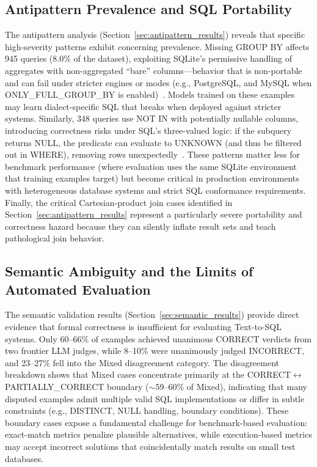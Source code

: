 \documentclass[]{einformatica}
\begin{document}
\subsection{Antipattern Prevalence and SQL Portability}

The antipattern analysis (Section~\ref{sec:antipattern_results}) reveals that specific high-severity patterns exhibit concerning prevalence. Missing GROUP BY affects 945 queries (8.0\% of the dataset), exploiting SQLite's permissive handling of aggregates with non-aggregated ``bare'' columns---behavior that is non-portable and can fail under stricter engines or modes (e.g., PostgreSQL, and MySQL when ONLY\_FULL\_GROUP\_BY is enabled)~\cite{sqliteBareColumns,postgresGroupBy,mysqlGroupByHandling}. Models trained on these examples may learn dialect-specific SQL that breaks when deployed against stricter systems. Similarly, 348 queries use NOT IN with potentially nullable columns, introducing correctness risks under SQL's three-valued logic: if the subquery returns NULL, the predicate can evaluate to UNKNOWN (and thus be filtered out in WHERE), removing rows unexpectedly~\cite{iso9075_2_2016}. These patterns matter less for benchmark performance (where evaluation uses the same SQLite environment that training examples target) but become critical in production environments with heterogeneous database systems and strict SQL conformance requirements. Finally, the critical Cartesian-product join cases identified in Section~\ref{sec:antipattern_results} represent a particularly severe portability and correctness hazard because they can silently inflate result sets and teach pathological join behavior.

\subsection{Semantic Ambiguity and the Limits of Automated Evaluation}

The semantic validation results (Section~\ref{sec:semantic_results}) provide direct evidence that formal correctness is insufficient for evaluating Text-to-SQL systems. Only 60--66\% of examples achieved unanimous CORRECT verdicts from two frontier LLM judges, while 8--10\% were unanimously judged INCORRECT, and 23--27\% fell into the Mixed disagreement category. The disagreement breakdown shows that Mixed cases concentrate primarily at the CORRECT$\leftrightarrow$PARTIALLY\_CORRECT boundary ($\sim$59--60\% of Mixed), indicating that many disputed examples admit multiple valid SQL implementations or differ in subtle constraints (e.g., DISTINCT, NULL handling, boundary conditions). These boundary cases expose a fundamental challenge for benchmark-based evaluation: exact-match metrics penalize plausible alternatives, while execution-based metrics may accept incorrect solutions that coincidentally match results on small test databases.
\end{document}
